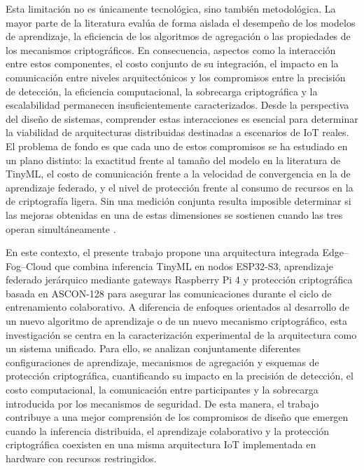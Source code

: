 \documentclass[journal,article,submit,moreauthors]{Definitions/mdpi}
\begin{document}
Esta limitación no es únicamente tecnológica, sino también metodológica. La mayor parte de la literatura evalúa de forma aislada el desempeño de los modelos de aprendizaje, la eficiencia de los algoritmos de agregación o las propiedades de los mecanismos criptográficos. En consecuencia, aspectos como la interacción entre estos componentes, el costo conjunto de su integración, el impacto en la comunicación entre niveles arquitectónicos y los compromisos entre la precisión de detección, la eficiencia computacional, la sobrecarga criptográfica y la escalabilidad permanecen insuficientemente caracterizados. Desde la perspectiva del diseño de sistemas, comprender estas interacciones es esencial para determinar la viabilidad de arquitecturas distribuidas destinadas a escenarios de IoT reales. El problema de fondo es que cada uno de estos compromisos se ha estudiado en un plano distinto: la exactitud frente al tamaño del modelo en la literatura de TinyML, el costo de comunicación frente a la velocidad de convergencia en la de aprendizaje federado, y el nivel de protección frente al consumo de recursos en la de criptografía ligera. Sin una medición conjunta resulta imposible determinar si las mejoras obtenidas en una de estas dimensiones se sostienen cuando las tres operan simultáneamente \cite{Alshammari2026,Cooray2025}.

En este contexto, el presente trabajo propone una arquitectura integrada Edge--Fog--Cloud que combina inferencia TinyML en nodos ESP32-S3, aprendizaje federado jerárquico mediante gateways Raspberry Pi 4 y protección criptográfica basada en ASCON-128 para asegurar las comunicaciones durante el ciclo de entrenamiento colaborativo. A diferencia de enfoques orientados al desarrollo de un nuevo algoritmo de aprendizaje o de un nuevo mecanismo criptográfico, esta investigación se centra en la caracterización experimental de la arquitectura como un sistema unificado. Para ello, se analizan conjuntamente diferentes configuraciones de aprendizaje, mecanismos de agregación y esquemas de protección criptográfica, cuantificando su impacto en la precisión de detección, el costo computacional, la comunicación entre participantes y la sobrecarga introducida por los mecanismos de seguridad. De esta manera, el trabajo contribuye a una mejor comprensión de los compromisos de diseño que emergen cuando la inferencia distribuida, el aprendizaje colaborativo y la protección criptográfica coexisten en una misma arquitectura IoT implementada en hardware con recursos restringidos.

\end{document}
